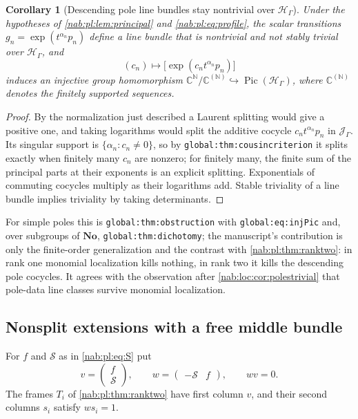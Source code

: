 \documentclass[11pt,letterpaper]{article}
\newtheorem{corollary}[corollary]{Corollary}
\theoremstyle{definition}
\theoremstyle{remark}
\newcommand{\C}{\mathbb C}
\newcommand{\N}{\mathbb N}
\newcommand{\No}{\mathbf{No}}
\newcommand{\HH}{\mathscr H_\Gamma}
\newcommand{\JJ}{\mathscr J_\Gamma}
\newcommand{\Pic}{\operatorname{Pic}}
\numberwithin{equation}{section}
\begin{document}
\begin{corollary}[Descending pole line bundles stay nontrivial over
$\HH$]\label{nab:pl:cor:line}
Under the hypotheses of \cref{nab:pl:lem:principal} and
\eqref{nab:pl:eq:profile}, the scalar transitions $g_n=\exp(t^{\alpha_n}p_n)$
define a line bundle that is nontrivial and not stably trivial over $\HH$, and
\begin{equation}\label{nab:pl:eq:picseq}
 (c_n)\longmapsto\bigl[\exp(c_nt^{\alpha_n}p_n)\bigr]
\end{equation}
induces an injective group homomorphism
$\C^{\N}/\C^{(\N)}\hookrightarrow\Pic(\HH)$, where $\C^{(\N)}$ denotes the
finitely supported sequences.
\end{corollary}

\begin{proof}
By the normalization just described a Laurent splitting would give a positive
one, and taking logarithms would split the additive cocycle
$c_nt^{\alpha_n}p_n$ in $\JJ$. Its singular support is
$\{\alpha_n:c_n\neq0\}$, so by \nolinkurl{global:thm:cousincriterion} it splits
exactly when finitely many $c_n$ are nonzero; for finitely many, the finite sum
of the principal parts at their exponents is an explicit splitting.
Exponentials of commuting cocycles multiply as their logarithms add. Stable
triviality of a line bundle implies triviality by taking determinants.
\end{proof}

For simple poles this is \nolinkurl{global:thm:obstruction} with
\nolinkurl{global:eq:injPic} and, over subgroups of $\No$,
\nolinkurl{global:thm:dichotomy}; the manuscript's contribution is only the
finite-order generalization and the contrast with
\cref{nab:pl:thm:ranktwo}: in rank one monomial localization kills nothing,
in rank two it kills the descending pole cocycles. It agrees with the
observation after \cref{nab:loc:cor:polestrivial} that pole-data line classes
survive monomial localization.

\subsection{Nonsplit extensions with a free middle bundle}

For $f$ and $\mathcal S$ as in \eqref{nab:pl:eq:S} put
\begin{equation}\label{nab:pl:eq:columnrow}
 v=\begin{pmatrix}f\\ \mathcal S\end{pmatrix},\qquad
 w=\begin{pmatrix}-\mathcal S&f\end{pmatrix},\qquad wv=0 .
\end{equation}
The frames $T_i$ of \cref{nab:pl:thm:ranktwo} have first column $v$, and their
second columns $s_i$ satisfy $ws_i=1$.
\end{document}

